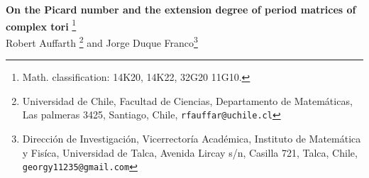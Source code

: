 \documentclass[11pt,leqno]{article}
\theoremstyle{definition}
\begin{document}
\def\R{\mathbb{R}}                   %
\def\Z{\mathbb{Z}}                   %
\def\Q{\mathbb{Q}}                   %
\def\C{\mathbb{C}}                   %
\def\N{\mathbb{N}}                   %
\def\H{{\mathbb H}}                %
\def\A{\mathbb{A}}

\def\P{\mathbb{P}}
\def\Gal{\text{Gal}}
\def\GHod{\text{GHod}}
\def\SHod{\text{SHod}}
\def\Hod{\text{Hod}}
\def\res{\text{res}}
\def\prim{\text{prim}}
\def\dR{\text{dR}}
\def\Jac{\text{Jac }}
\def\Hom{\text{Hom}}

\def\ker{{\rm ker}}              %
\def\GL{{\rm GL}}                %
\def\ker{{\rm ker}}              %
\def\coker{{\rm coker}}          %
\def\im{{\rm Im}}               %
\def\coim{{\rm Coim}}            %
\def\NS{{\rm NS}}              %
\def\End{{\rm End}}              %
\def\rank{{\rm rank}}                %
\def\gcd{{\rm gcd}}                  %




\begin{center}
{\LARGE\bf On the Picard number and the extension degree of period matrices of complex tori
}
\footnote{ 
Math. classification: 14K20, 14K22, 32G20 11G10.
}
\\
\vspace{.25in} {\large{{\sc Robert Auffarth }}\footnote{Universidad de Chile, Facultad de Ciencias, Departamento de Matemáticas, Las palmeras 3425, Santiago, Chile,
{\tt rfauffar@uchile.cl}}}
 {{\sc and Jorge Duque Franco}}\footnote{ Dirección de Investigación, Vicerrectoría Académica, Instituto de Matemática y Fisíca, Universidad de Talca, Avenida Lircay s/n, Casilla 721, Talca, Chile, {\tt georgy11235@gmail.com}}
\end{center}


 
\end{document}
